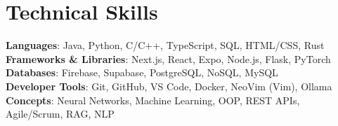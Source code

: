 \documentclass[letterpaper,11pt]{article}
\begin{document}
\section{Technical Skills}
 \begin{itemize}[leftmargin=0.15in, label={}]
    \small{\item{
     \textbf{Languages}{: Java, Python, C/C++, TypeScript, SQL, HTML/CSS, Rust} \\
     \textbf{Frameworks \& Libraries}{: Next.js, React, Expo, Node.js, Flask, PyTorch} \\
     \textbf{Databases}{: Firebase, Supabase, PostgreSQL, NoSQL, MySQL} \\
     \textbf{Developer Tools}{: Git, GitHub, VS Code, Docker, NeoVim (Vim), Ollama} \\
     \textbf{Concepts}{: Neural Networks, Machine Learning, OOP, REST APIs, Agile/Scrum, RAG, NLP}
    }}
 \end{itemize}
\end{document}

